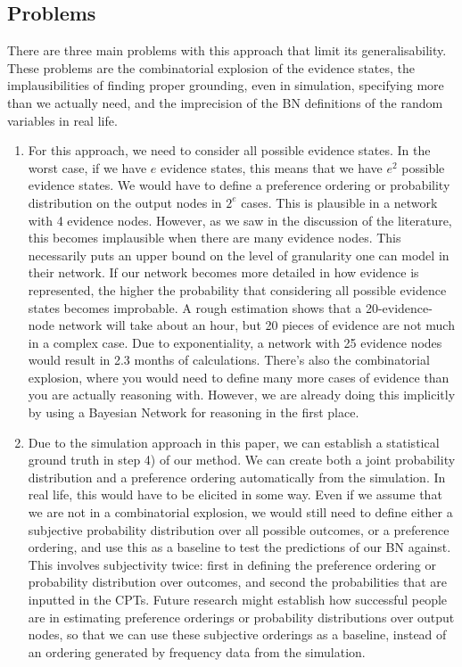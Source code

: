 \documentclass[12pt]{article}
\begin{document}
\subsection{Problems}

There are three main problems with this approach that limit its generalisability. These problems are the combinatorial explosion of the evidence states, the implausibilities of finding proper grounding, even in simulation, specifying more than we actually need, and the imprecision of the BN definitions of the random variables in real life.

\begin{enumerate}

\item For this approach, we need to consider all possible evidence states. In the worst case, if we have $e$ evidence states, this means that we have $e^2$ possible evidence states. We would have to define a preference ordering or probability distribution on the output nodes in $2^e$ cases. This is plausible in a network with 4 evidence nodes. However, as we saw in the discussion of the literature, this becomes implausible when there are many evidence nodes. 
This necessarily puts an upper bound on the level of granularity one can model in their network. If our network becomes more detailed in how evidence is represented, the higher the probability that considering all possible evidence states becomes improbable. A rough estimation shows that a 20-evidence-node network will take about an hour, but 20 pieces of evidence are not much in a complex case. Due to exponentiality, a network with 25 evidence nodes would result in 2.3 months of calculations.
There's also the combinatorial explosion, where you would need to define many more cases of evidence than you are actually reasoning with. However, we are already doing this implicitly by using a Bayesian Network for reasoning in the first place. 

\item Due to the simulation approach in this paper, we can establish a statistical ground truth in step 4) of our method. We can create both a joint probability distribution and a preference ordering automatically from the simulation. In real life, this would have to be elicited in some way. Even if we assume that we are not in a combinatorial explosion, we would still need to define either a subjective probability distribution over all possible outcomes, or a preference ordering, and use this as a baseline to test the predictions of our BN against. This involves subjectivity twice: first in defining the preference ordering or probability distribution over outcomes, and second the probabilities that are inputted in the CPTs. Future research might establish how successful people are in estimating preference orderings or probability distributions over output nodes, so that we can use these subjective orderings as a baseline, instead of an ordering generated by frequency data from the simulation. 


\end{enumerate}
\end{document}
